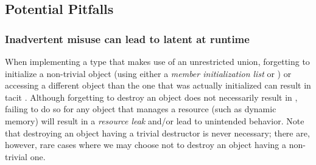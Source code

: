 
\subsection[Potential Pitfalls]{Potential Pitfalls}\label{potential-pitfalls}

\subsubsection[Inadvertent misuse can lead to latent \romeogloss{undefined behavior} at runtime]{Inadvertent misuse can lead to latent  at runtime}\label{inadvertent-misuse-can-lead-to-latent-undefined-behavior-at-runtime}

When implementing a type that makes use of an unrestricted union,
forgetting to initialize a non-trivial object (using either a
\emph{member initialization list} or ) or
accessing a different object than the one that was actually initialized
can result in tacit . Although forgetting to
destroy an object does not necessarily result in , failing to do so for any object that manages a resource (such
as dynamic memory) will result in a \emph{resource leak} and/or lead to
unintended behavior. Note that destroying an
object having a trivial destructor is never necessary; there are, however, rare cases where
we may choose not to destroy an object having a non-trivial
one.

